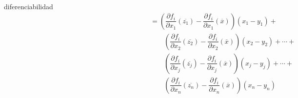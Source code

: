 \documentclass[fleqn, 12pt]{article}
\newenvironment{ejercicio}[1]{\begin{ejer}[breakable, pad at break = 5mm, leftrule = 0.7mm, rightrule = 0.7mm, right = 2mm, left = 2mm, enlarge bottom finally by = 3mm]{}{#1}}{\end{ejer}}
\begin{document}
\begin{ejercicio}{diferenciabilidad}
		\begin{equation*}
			\begin{split}
				\phantom{ f_i(\overline{x}) - f_i(\overline{y}) - \sum_{j=1}^{n} \dfrac{\partial f_i}{\partial x_j} (\overline{x}) \left( x_j - y_j \right) } &= \left( \dfrac{\partial f_i}{\partial x_1} (\overline{z_1}) - \dfrac{\partial f_i}{\partial x_1} (\overline{x}) \right) \left( x_1 - y_1 \right) + \\
				& \qquad \left( \dfrac{\partial f_i}{\partial x_2} (\overline{z_2}) - \dfrac{\partial f_i}{\partial x_2} (\overline{x}) \right) \left( x_2 - y_2 \right) + \cdots + \\
				& \qquad \left( \dfrac{\partial f_i}{\partial x_j} (\overline{z_j}) - \dfrac{\partial f_i}{\partial x_j} (\overline{x}) \right) \left( x_j - y_j \right) + \cdots + \\
				& \qquad \left( \dfrac{\partial f_i}{\partial x_n} (\overline{z_n}) - \dfrac{\partial f_i}{\partial x_n} (\overline{x}) \right) \left( x_n - y_n \right)
			\end{split}
		\end{equation*}


\end{ejercicio}
\end{document}
